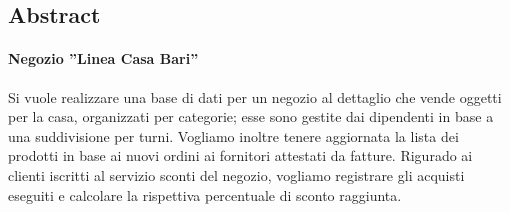 \subsection{Abstract}
\paragraph*{Negozio ''Linea Casa Bari''}
Si vuole realizzare una base di dati per un negozio al dettaglio che vende oggetti per la casa, organizzati per categorie; esse sono gestite dai dipendenti in base a una suddivisione per turni. Vogliamo inoltre tenere aggiornata la lista dei prodotti in base ai nuovi ordini ai fornitori attestati da fatture. Rigurado ai clienti iscritti al servizio sconti del negozio, vogliamo registrare gli acquisti eseguiti e calcolare la rispettiva percentuale di sconto raggiunta.
